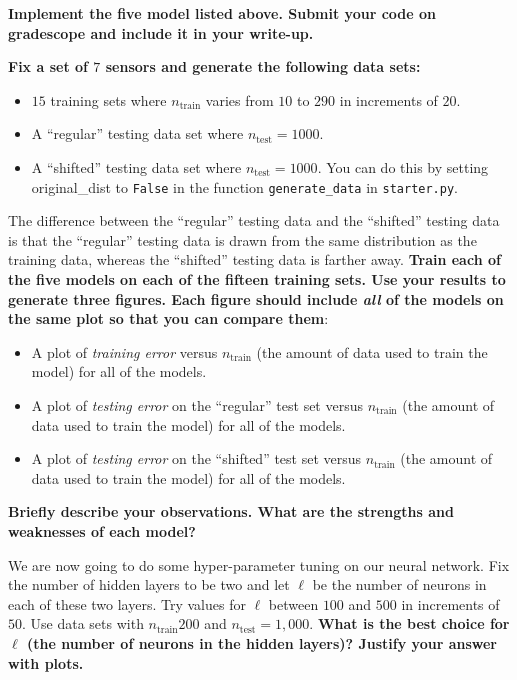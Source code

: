 \begin{Parts}

\Part \textbf{Implement the five model listed above. Submit your code on gradescope and include it in your write-up.}

\Part \label{pt:models} \textbf{Fix a set of $7$ sensors and generate the following data sets:}
	\begin{itemize}
		\item $15$ training sets where $n_\text{train}$ varies from $10$ to $290$ in increments of $20$.
		\item A ``regular'' testing data set where $n_\text{test} = 1000$.
		\item A ``shifted'' testing data set where $n_\text{test} = 1000$. You can do this by setting original\_dist to \texttt{False} in the function \texttt{generate\_data} in \texttt{starter.py}.
	\end{itemize}
	The difference between the ``regular'' testing data and the ``shifted'' testing data is that the ``regular'' testing data is drawn from the same distribution as the training data, whereas the ``shifted'' testing data is farther away. \textbf{Train each of the five models on each of the fifteen training sets. Use your results to generate three figures. Each figure should include \emph{all} of the models on the same plot so that you can compare them}:
	\begin{itemize}
		\item A plot of \emph{training error} versus $n_\text{train}$ (the amount of data used to train the model) for all of the models.
		\item A plot of \emph{testing error} on the ``regular'' test set versus $n_\text{train}$ (the amount of data used to train the model) for all of the models.
		\item A plot of \emph{testing error} on the ``shifted'' test set versus $n_\text{train}$ (the amount of data used to train the model) for all of the models.
	\end{itemize}
	\textbf{Briefly describe your observations. What are the strengths and weaknesses of each model?}



\Part We are now going to do some hyper-parameter tuning on our neural network. Fix the number of hidden layers to be two and let $\ell$ be the number of neurons in each of these two layers. Try values for $\ell$ between $100$ and $500$ in increments of $50$. Use data sets with $n_\text{train}200$ and $n_\text{test}=1,000$. \textbf{What is the best choice for $\ell$ (the number of neurons in the hidden layers)? Justify your answer with plots.}




\end{Parts}
